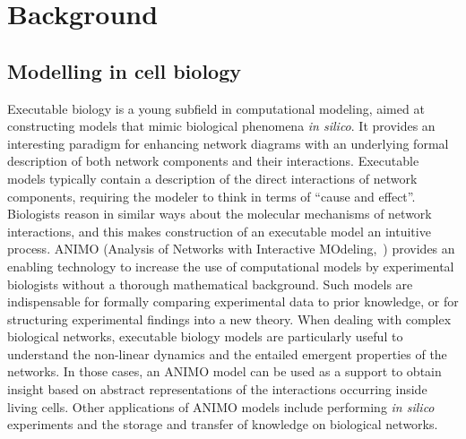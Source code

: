 \documentclass{bmcart}
\begin{document}
\section*{Background}\label{sec:introduction}
\subsection*{Modelling in cell biology}
Executable biology is a young subfield in computational modeling, aimed at constructing models that mimic
biological phenomena \emph{in silico}. It provides an interesting paradigm for enhancing network
diagrams with an underlying formal description of both network components and their interactions.
Executable models typically contain a description of the direct interactions of network components,
requiring the modeler to think in terms of
``cause and effect''. Biologists reason in similar ways about the molecular mechanisms of network
interactions, and this makes construction of an executable model an intuitive process.
ANIMO (Analysis of Networks with Interactive MOdeling,~\cite{animo-ieee,animo-gene})
provides an enabling technology to increase the use of computational models by experimental
 biologists without a thorough mathematical background. Such models are indispensable for formally
comparing experimental data to prior knowledge, or for structuring experimental findings into a
new theory.
When dealing with complex biological networks, executable biology models are particularly useful
to understand the non-linear dynamics and the entailed emergent properties of the networks.
In those cases, an ANIMO model can be used as a support to obtain insight based on abstract
representations of the interactions occurring inside living cells.
Other applications of ANIMO models include performing \emph{in silico} experiments and
the storage and transfer of knowledge on biological networks.
\end{document}
